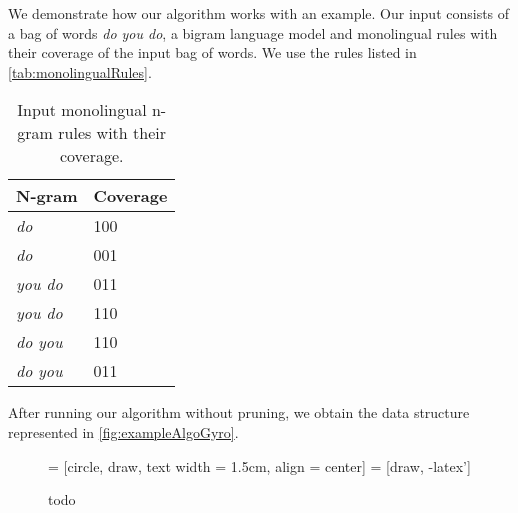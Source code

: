 We demonstrate how our algorithm works with an example.
Our input consists of a bag of words \emph{do you do},
a bigram language model and monolingual rules with
their coverage of the input bag of words. We use the
rules listed in \autoref{tab:monolingualRules}.
%
\begin{table}
  \begin{center}
  \begin{tabular}{l|l}
    N-gram & Coverage \\
    \hline
    \emph{do} & 100 \\
    \emph{do} & 001 \\
    \emph{you do} & 011 \\
    \emph{you do} & 110 \\
    \emph{do you} & 110 \\
    \emph{do you} & 011 \\
  \end{tabular}
  \caption{Input monolingual n-gram rules with their coverage.}
  \label{tab:monolingualRules}
  \end{center}
\end{table}
%
After running our algorithm without pruning, we obtain the data structure
represented in \autoref{fig:exampleAlgoGyro}.
%
\begin{figure}
  \scriptsize
   = [circle, draw, text width = 1.5cm, align = center]
   = [draw, -latex']

  \begin{center}
  \end{center}
  \caption{todo}
  \label{fig:exampleAlgoGyro}
\end{figure}

